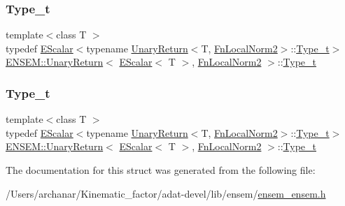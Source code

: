 \subsubsection{\texorpdfstring{Type\_t}{Type\_t}\hspace{0.1cm}{\footnotesize\ttfamily [2/3]}}
{\footnotesize\ttfamily template$<$class T $>$ \\
typedef \mbox{\hyperlink{classENSEM_1_1EScalar}{E\+Scalar}}$<$typename \mbox{\hyperlink{structENSEM_1_1UnaryReturn}{Unary\+Return}}$<$T, \mbox{\hyperlink{structENSEM_1_1FnLocalNorm2}{Fn\+Local\+Norm2}}$>$\+::\mbox{\hyperlink{structENSEM_1_1UnaryReturn_3_01EScalar_3_01T_01_4_00_01FnLocalNorm2_01_4_ab80faba745e53e04277e860e474c3e19}{Type\+\_\+t}}$>$ \mbox{\hyperlink{structENSEM_1_1UnaryReturn}{E\+N\+S\+E\+M\+::\+Unary\+Return}}$<$ \mbox{\hyperlink{classENSEM_1_1EScalar}{E\+Scalar}}$<$ T $>$, \mbox{\hyperlink{structENSEM_1_1FnLocalNorm2}{Fn\+Local\+Norm2}} $>$\+::\mbox{\hyperlink{structENSEM_1_1UnaryReturn_3_01EScalar_3_01T_01_4_00_01FnLocalNorm2_01_4_ab80faba745e53e04277e860e474c3e19}{Type\+\_\+t}}}

\mbox{\label{structENSEM_1_1UnaryReturn_3_01EScalar_3_01T_01_4_00_01FnLocalNorm2_01_4_ab80faba745e53e04277e860e474c3e19}} 
\subsubsection{\texorpdfstring{Type\_t}{Type\_t}\hspace{0.1cm}{\footnotesize\ttfamily [3/3]}}
{\footnotesize\ttfamily template$<$class T $>$ \\
typedef \mbox{\hyperlink{classENSEM_1_1EScalar}{E\+Scalar}}$<$typename \mbox{\hyperlink{structENSEM_1_1UnaryReturn}{Unary\+Return}}$<$T, \mbox{\hyperlink{structENSEM_1_1FnLocalNorm2}{Fn\+Local\+Norm2}}$>$\+::\mbox{\hyperlink{structENSEM_1_1UnaryReturn_3_01EScalar_3_01T_01_4_00_01FnLocalNorm2_01_4_ab80faba745e53e04277e860e474c3e19}{Type\+\_\+t}}$>$ \mbox{\hyperlink{structENSEM_1_1UnaryReturn}{E\+N\+S\+E\+M\+::\+Unary\+Return}}$<$ \mbox{\hyperlink{classENSEM_1_1EScalar}{E\+Scalar}}$<$ T $>$, \mbox{\hyperlink{structENSEM_1_1FnLocalNorm2}{Fn\+Local\+Norm2}} $>$\+::\mbox{\hyperlink{structENSEM_1_1UnaryReturn_3_01EScalar_3_01T_01_4_00_01FnLocalNorm2_01_4_ab80faba745e53e04277e860e474c3e19}{Type\+\_\+t}}}



The documentation for this struct was generated from the following file\+:\begin{DoxyCompactItemize}
\item 
/\+Users/archanar/\+Kinematic\+\_\+factor/adat-\/devel/lib/ensem/\mbox{\hyperlink{adat-devel_2lib_2ensem_2ensem__ensem_8h}{ensem\+\_\+ensem.\+h}}\end{DoxyCompactItemize}

